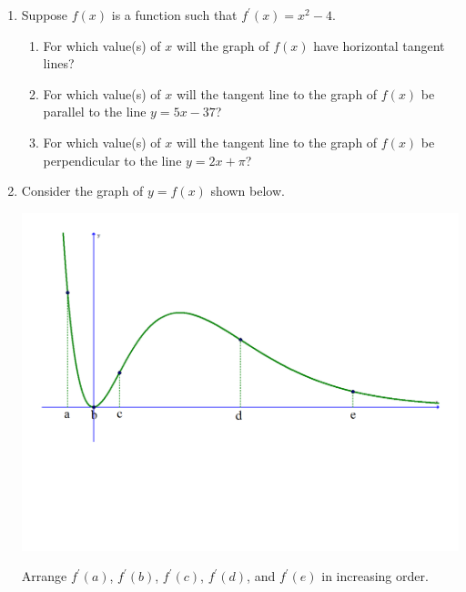 \documentclass[12pt]{article}
\newif\ifans
\begin{document}
\begin{enumerate}
\ifans{\fbox{$f(1)=2$; $\displaystyle f^{\prime}(1)=\frac{1}{2}$}} \fi

\item Suppose $f(x)$ is a function such that $f^{\prime}(x)=x^2-4$.

\begin{enumerate}

\item For which value(s) of $x$ will the graph of $f(x)$ have horizontal tangent lines?

\ifans{\fbox{$x=2$ or $x=-2$}} \fi

\item For which value(s) of $x$ will the tangent line to the graph of $f(x)$ be parallel to the line $y=5x-37$?

\ifans{\fbox{$x=3$ or $x=-3$}} \fi

\item For which value(s) of $x$ will the tangent line to the graph of $f(x)$ be perpendicular to the line $y=2x+\pi$?

\ifans{\fbox{$\displaystyle x=\sqrt{\frac{7}{2}}$ or $\displaystyle x=-\sqrt{\frac{7}{2}}$}} \fi

\end{enumerate}

\item Consider the graph of $y=f(x)$ shown below.\\
\begin{center}
\includegraphics[scale=0.45]{graph.pdf}
\end{center}

Arrange $f^{\prime}(a)$, $f^{\prime}(b)$, $f^{\prime}(c)$, $f^{\prime}(d)$, and $f^{\prime}(e)$ in increasing order.


\end{enumerate}
\end{document}
